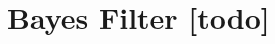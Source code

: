 \begin{comment}
------------------------------------------------------------------------------------------
- https://matheguru.com/stochastik/standardfehler.html
- https://de.wikipedia.org/wiki/Standardfehler
- Theorie: Lokalisierungsprobleme
	- Statische Lokalisierung
		- Akkurate Schätzung seiner globalen Position anhand der Sensordaten
		- Annahme: Umgebungskarte der Landmarken ist vorhanden
	- Position Tracking/Positionsverfolgung
		- Initiale Position ist gegeben
		- Verfogenden der Roboterposition
		- Annahme: Umgebungskarte der Landmarken ist vorhanden
	- SLAM
		- Verwenden der Sensordaten um sich zu Lokalisierung...
		- und eine Karte der Landmarken zu erzeugen.
		- Bisher Winkel und Entferung zu einer Landmarke gegeben
			- Computer Vision, Structure from Motion
		- Hier nur die Entfernung
- A Short Introduction to the Bayes Filter and Related Models
	- http://ais.informatik.uni-freiburg.de/teaching/ws12/mapping/pdf/slam02-bayes-filter-short.pdf
- Bayes Filter
	- https://www.tu-chemnitz.de/informatik/KI/edu/robotik/ws2012/robotik_6_2.pdf
\end{comment}
\section{Bayes Filter [todo]}


\begin{comment}
------------------------------------------------------------------------------------------
- \cite{kalman1960new}
- \cite{kurth2003experimental}
	- Originally introduced in 1960, the Kalman Filter assumes a multivariate Gaussian distribution [6]. The Kalman Filter has the advantage that the representation of the distribution is compact; a Gaussian distribution can be represented by a mean and a covariance matrix. The robot's pose estimation is maintained as a Gaussian distribution and sensor data from dead reckoning and landmark observations is fused to obtain a new position distribution.
	- Our results with Kalman Filtering require an under-standing of the characteristics of the noise present in ranges reported by the radio tags. We gain this by look-ing at the probability distribution functions for each tag measurement.
	- We obtain the PDFs as follows: for every reported measurement, we and the true range to the robot when that distance was reported. We do this by comparing the known location of the reporting tag to the times-tamped true location of the robot when the report was received.
	- the covariance matrix, which describes the uncertainty and correlation of the terms in the state estimate.
	- However, when the same initial noisy tag locations are used with Test 2, our SLAM technique fails to converge. Since the Kalman Filter uses a linearization of the nonlinear range measurements, if the linearized estimate is too far away from the truth, the Filter may be unable to recover and will diverge.

- https://www.youtube.com/watch?v=CaCcOwJPytQ
	- Special Topics - The Kalman Filter (1 of 55) What is a Kalman Filter?

\end{comment}
